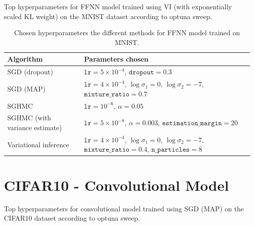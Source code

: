 \begin{table}[H]
    \centering
    \resizebox{
        \ifdim\width>\columnwidth
        \columnwidth
      \else
        \width
      \fi
    }{!}{\small
    
    }
    \caption{Top hyperparameters for FFNN model trained using VI (with exponentially scaled KL weight) on the MNIST dataset according to optuna sweep.}
    \label{tab:mnist-vi-exp-weighted-hparams}
\end{table}



\begin{table}[H]
    \centering
    \begin{tabular}{p{4cm}p{9cm}}
        \toprule
        Algorithm & Parameters chosen \\ \midrule
        SGD (dropout) & $\texttt{lr}=5\times 10^{-4}$,
        $\texttt{dropout}=0.3$ \\ \midrule
        SGD (MAP) & 
        $\texttt{lr}=4 \times 10^{-4}$, 
        $\log\sigma_1=0$, 
        $\log\sigma_2=-7$, 
        $\texttt{mixture\_ratio}=0.7$ \\ \midrule
        SGHMC & $\texttt{lr}=10^{-6}$, $\alpha=0.05$ \\ \midrule
        SGHMC (with variance estimate) &  $\texttt{lr}= 5 \times 10^{-8}$, 
        $\alpha=0.003$,
        $\texttt{estimation\_margin}=20$ \\ \midrule
        Variational inference &    
        $\texttt{lr}=4 \times 10^{-4}$,
        $\log\sigma_1=0$,
        $\log\sigma_2=-7$,
        $\texttt{mixture\_ratio}=0.4$,
        $\texttt{n\_particles}=8$ \\
        \bottomrule
    \end{tabular}
    \caption{Chosen hyperparameters the different methods for FFNN model trained on MNIST.}
    \label{tab:mnist-hparams}
\end{table}

\FloatBarrier

\section{CIFAR10 - Convolutional Model}

\begin{table}[H]
    \centering
    \resizebox{
        \ifdim\width>\columnwidth
        \columnwidth
      \else
        \width
      \fi
    }{!}{\small
    
    }
    \caption{Top hyperparameters for convolutional model trained using SGD (MAP) on the CIFAR10 dataset according to optuna sweep.}
    \label{tab:cifar-small-sgd-map-hparams}
\end{table}

